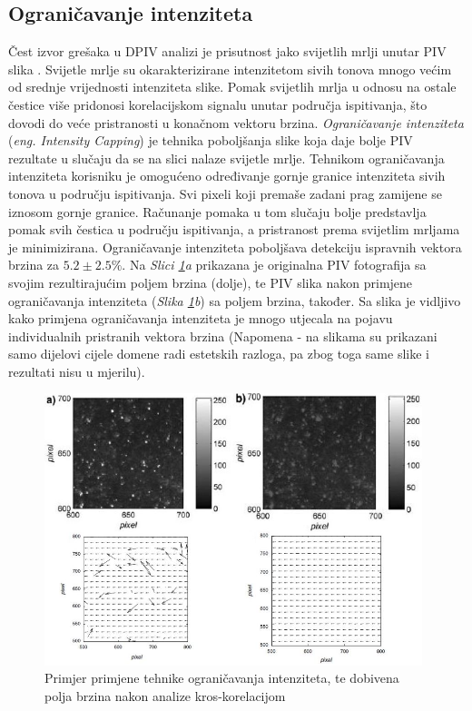 \subsection{Ograničavanje intenziteta}
Čest izvor grešaka u DPIV analizi je prisutnost jako svijetlih mrlji unutar PIV slika \cite{shavit2007intensity}. Svijetle mrlje su okarakterizirane intenzitetom sivih tonova mnogo većim od srednje vrijednosti intenziteta slike. Pomak svijetlih mrlja u odnosu na ostale čestice više pridonosi korelacijskom signalu unutar područja ispitivanja, što dovodi do veće pristranosti u konačnom vektoru brzina. \textit{Ograničavanje intenziteta} (\textit{eng. Intensity Capping}) je tehnika poboljšanja slike koja daje bolje PIV rezultate u slučaju da se na slici nalaze svijetle mrlje. Tehnikom ograničavanja intenziteta korisniku je omogućeno određivanje gornje granice intenziteta sivih tonova u području ispitivanja. Svi pixeli koji premaše zadani prag zamijene se iznosom gornje granice. Računanje pomaka u tom slučaju bolje predstavlja pomak svih čestica u području ispitivanja, a pristranost prema svijetlim mrljama je minimizirana. Ograničavanje intenziteta poboljšava detekciju ispravnih vektora brzina za $5.2 \pm 2.5\%$. Na \textit{Slici \ref{sl:2.6}a} prikazana je originalna PIV fotografija sa svojim rezultirajućim poljem brzina (dolje), te PIV slika nakon primjene ograničavanja intenziteta (\textit{Slika \ref{sl:2.6}b}) sa poljem brzina, također. Sa slika je vidljivo kako primjena ograničavanja intenziteta je mnogo utjecala na pojavu individualnih pristranih vektora brzina (Napomena - na slikama su prikazani samo dijelovi cijele domene radi estetskih razloga, pa zbog toga same slike i rezultati nisu u mjerilu).
\begin{figure}[h]  
	\centering
	\includegraphics[width=11cm]{./2_DPIV/2_6IntensityCapping.jpg} 
	\caption{Primjer primjene tehnike ograničavanja intenziteta, te dobivena polja brzina nakon analize kros-korelacijom \cite{shavit2007intensity}}
	\label{sl:2.6}
\end{figure}
\FloatBarrier
